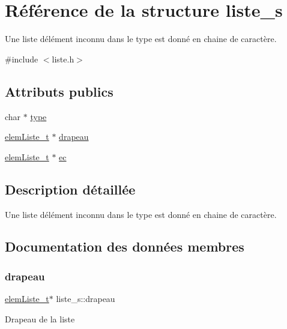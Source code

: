 \hypertarget{structliste__s}{}\section{Référence de la structure liste\+\_\+s}
\label{structliste__s}


Une liste d\textquotesingle{}élément inconnu dans le type est donné en chaine de caractère.  




{\ttfamily \#include $<$liste.\+h$>$}

\subsection*{Attributs publics}
\begin{DoxyCompactItemize}
\item 
char $\ast$ \hyperlink{structliste__s_a85b56be0222a73dfde956aae220b6331}{type}
\item 
\hyperlink{structelem_liste__s}{elem\+Liste\+\_\+t} $\ast$ \hyperlink{structliste__s_aef9dbdf8c2c0370440b9bb9de250041a}{drapeau}
\item 
\hyperlink{structelem_liste__s}{elem\+Liste\+\_\+t} $\ast$ \hyperlink{structliste__s_a66e567f3f41e8e9a451ba207bbd93a3a}{ec}
\end{DoxyCompactItemize}


\subsection{Description détaillée}
Une liste d\textquotesingle{}élément inconnu dans le type est donné en chaine de caractère. 

\subsection{Documentation des données membres}
\mbox{\label{structliste__s_aef9dbdf8c2c0370440b9bb9de250041a}} 
\subsubsection{\texorpdfstring{drapeau}{drapeau}}
{\footnotesize\ttfamily \hyperlink{structelem_liste__s}{elem\+Liste\+\_\+t}$\ast$ liste\+\_\+s\+::drapeau}

Drapeau de la liste \mbox{\label{structliste__s_a66e567f3f41e8e9a451ba207bbd93a3a}} 
